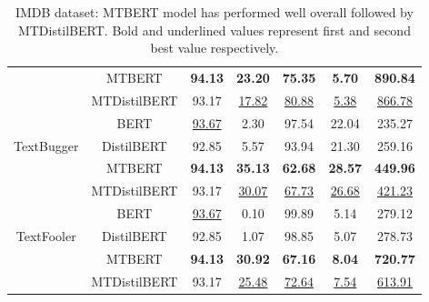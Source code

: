 \documentclass[%
	BCOR=8mm, %
	DIV=12,
	toc=bibliography, %
	toc=listof, %
	oneside, %
	egregdoesnotlikesansseriftitles, %
	]{scrbook}
\begin{document}
\begin{table}[H]
{\begin{tabular}{|c|c|c|c|c|c|c|}
                     & MTBERT &              \textbf{94.13}&                   \textbf{23.20} &                 \textbf{75.35} &                      \textbf{5.70} &          \textbf{890.84} \\
                     & MTDistilBERT &                93.17 &                   \underline{17.82} &                  \underline{80.88} &                     \underline{5.38} &           \underline{866.78} \\
                \midrule
                     & BERT &               		\underline{93.67} &                     2.30 &                  97.54 &                     22.04 &           235.27 \\
 TextBugger & DistilBERT &                92.85 &                     5.57 &                  93.94 &                     21.30 &           259.16 \\
                     & MTBERT &                \textbf{94.13} &                    \textbf{35.13} &                 \textbf{62.68} &                     \textbf{28.57} &           \textbf{449.96} \\
                     & MTDistilBERT &          93.17 &                   \underline{30.07} &                  \underline{67.73} &                     \underline{26.68} &           \underline{421.23} \\
                \midrule
                    & BERT &                		\underline{93.67} &                     0.10 &                  99.89 &                      5.14 &           279.12 \\
  TextFooler & DistilBERT &                92.85 &                     1.07 &                  98.85 &                      5.07 &           278.73 \\
                    & MTBERT &                \textbf{94.13} &          \textbf{30.92}&     \textbf{67.16} &        \textbf{8.04} &   \textbf{720.77} \\
                    & MTDistilBERT  &          93.17 &                    \underline{25.48} &                  \underline{72.64} &                     \underline{7.54} &           \underline{613.91} \\
                    \bottomrule
 \end{tabular}
    }
    \caption[Experiment result of IMDB dataset]{IMDB dataset: MTBERT model has performed well overall followed by MTDistilBERT. Bold and underlined values represent first and second best value respectively.}
    \label{table:IMDBExpRes}
\end{table}
\end{document}
